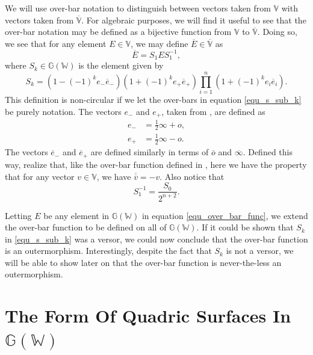 \documentclass{birkjour}
\theoremstyle{definition}
\theoremstyle{remark}
\numberwithin{equation}{section}
\newcommand{\G}{\mathbb{G}}
\newcommand{\V}{\mathbb{V}}
\newcommand{\Vb}{\mathbb{\overline{V}}}
\newcommand{\W}{\mathbb{W}}
\newcommand{\nvao}{o}
\newcommand{\nvai}{\infty}
\newcommand{\nvaob}{\overline{o}}
\newcommand{\nvaib}{\overline{\infty}}
\newcommand{\eminus}{e_{-}}
\newcommand{\eplus}{e_{+}}
\newcommand{\eminusb}{\overline{e}_{-}}
\newcommand{\eplusb}{\overline{e}_{+}}
\begin{document}
We will use over-bar notation to distinguish between vectors taken from $\V$
with vectors taken from $\Vb$.  For algebraic purposes, we will find it useful
to see that the over-bar notation may be defined as a bijective function
from $\V$ to $\Vb$.
Doing so, we see that for any element $E\in\V$,
we may define $\overline{E}\in\Vb$ as
\begin{equation}\label{equ_over_bar_func}
\overline{E} = S_1ES_1^{-1},
\end{equation}
where $S_k\in\G(\W)$ is the element given by
\begin{equation}\label{equ_s_sub_k}
S_k = (1-(-1)^k\eminus\eminusb)(1+(-1)^k\eplus\eplusb)\prod_{i=1}^n(1+(-1)^ke_i\overline{e}_i).
\end{equation}
This definition is non-circular if we let the over-bars in equation \eqref{equ_s_sub_k}
be purely notation.  The vectors $\eminus$ and $\eplus$, taken from \cite{LiRockwood},
are defined as
\begin{align}
\eminus &= \frac{1}{2}\nvai + \nvao, \\
\eplus &= \frac{1}{2}\nvai - \nvao.
\end{align}
The vectors $\eminusb$ and $\eplusb$ are defined similarly in terms of $\nvaob$ and $\nvaib$.
Defined this way, realize that, like the over-bar function defined in \cite{Parkin12},
here we have the property that for any vector $v\in\V$, we have $\overline{\overline{v}}=-v$.
Also notice that
\begin{equation}
S_1^{-1} = \frac{S_0}{2^{n+2}}.
\end{equation}

Letting $E$ be any element in $\G(\W)$ in equation \eqref{equ_over_bar_func},
we extend the over-bar function to be defined on all of $\G(\W)$.  If it could be
shown that $S_k$ in \eqref{equ_s_sub_k} was a versor, we could now conclude
that the over-bar function is an outermorphism.  Interestingly, despite the
fact that $S_k$ is not a versor, we will be
able to show later on that the over-bar function is never-the-less an outermorphism.

\section{The Form Of Quadric Surfaces In $\G(\W)$}
\end{document}
